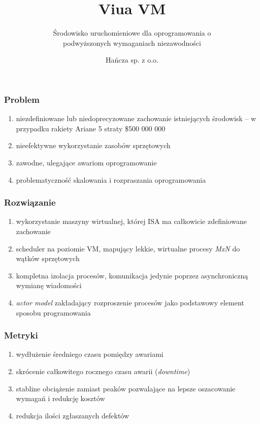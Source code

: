 \documentclass[aspectratio=169]{beamer}
\title{Viua VM}
\subtitle{Środowisko uruchomieniowe dla oprogramowania o\\podwyższonych wymaganiach niezawodności}
\author{Hańcza sp. z o.o.}
\begin{document}

\frame{\titlepage}

\begin{frame}
    \frametitle{Problem}

    \begin{enumerate}
        \item niezdefiniowane lub niedoprecyzowane zachowanie istniejących
            środowisk -- w przypadku rakiety Ariane 5 straty \$500 000 000
        \item nieefektywne wykorzystanie zasobów sprzętowych
        \item zawodne, ulegające awariom oprogramowanie
        \item problematyczność skalowania i rozpraszania oprogramowania
    \end{enumerate}
\end{frame}

\begin{frame}
    \frametitle{Rozwiązanie}

    \begin{enumerate}
        \item wykorzystanie maszyny wirtualnej, której ISA ma całkowicie
            zdefiniowane zachowanie
        \item scheduler na poziomie VM, mapujący lekkie, wirtualne procesy
            \emph{MxN} do wątków sprzętowych
        \item kompletna izolacja procesów, komunikacja jedynie poprzez
            asynchroniczną wymianę wiadomości
        \item \emph{actor model} zakładający rozproszenie procesów jako
            podstawowy element sposobu programowania
    \end{enumerate}
\end{frame}

\begin{frame}
    \frametitle{Metryki}

    \begin{enumerate}
        \item wydłużenie średniego czasu pomiędzy awariami
        \item skrócenie całkowitego rocznego czasu awarii (\emph{downtime})
        \item stabline obciążenie zamiast peaków pozwalające na lepsze
            oszacowanie wymagań i redukcję kosztów
        \item redukcja ilości zgłaszanych defektów
    \end{enumerate}
\end{frame}
\end{document}
